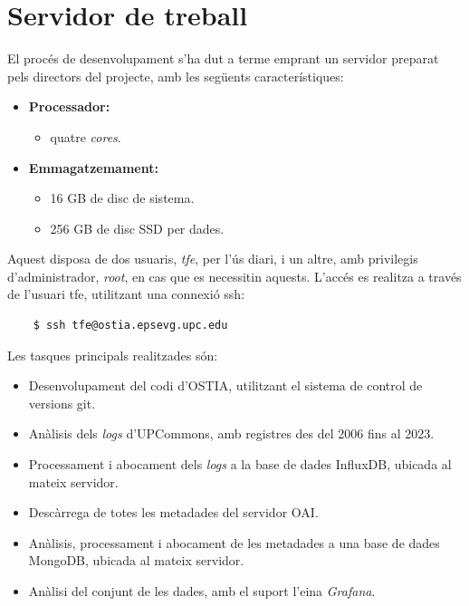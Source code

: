 \chapter{Servidor de treball}\label{ch:server-description}

El procés de desenvolupament s’ha dut a terme emprant un servidor preparat pels directors del projecte, amb les següents característiques:

\begin{itemize}
    \item \textbf{Processador:}
    \begin{itemize}
        \item quatre \textit{cores}.
    \end{itemize}
    \item \textbf{Emmagatzemament:}
    \begin{itemize}
        \item 16 GB de disc de sistema.
        \item 256 GB de disc SSD per dades.
    \end{itemize}
\end{itemize}

\noindent
Aquest disposa de dos usuaris, \textit{tfe}, per l’ús diari, i un altre, amb privilegis d’administrador, \textit{root}, en cas que es necessitin aquests.
L’accés es realitza a través de l’usuari tfe, utilitzant una connexió \gls{ssh}:

\begin{verbatim}
    $ ssh tfe@ostia.epsevg.upc.edu
\end{verbatim}

\noindent
Les tasques principals realitzades són:

\begin{itemize}
    \item Desenvolupament del codi d’\gls{OSTIA}, utilitzant el sistema de control de versions git.
    \item Anàlisis dels \textit{\gls{log}s} d’\gls{UPCommons}, amb registres des del 2006 fins al 2023.
    \item Processament i abocament dels \textit{\gls{log}s} a la base de dades InfluxDB, ubicada al mateix servidor.
    \item Descàrrega de totes les metadades del servidor \gls{OAI}.
    \item Anàlisis, processament i abocament de les metadades a una base de dades MongoDB, ubicada al mateix servidor.
    \item Anàlisi del conjunt de les dades, amb el suport l’eina \textit{Grafana}.
\end{itemize}

